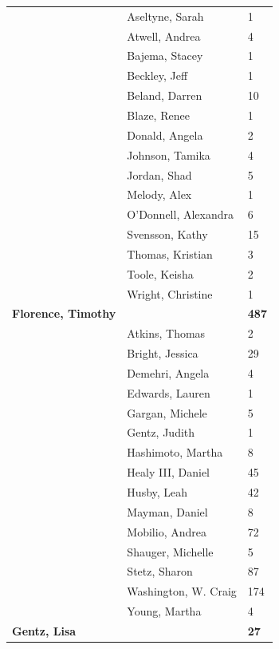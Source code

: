 \documentclass{article}\usepackage[]{graphicx}\usepackage[]{color}
\begin{document}
{\begin{longtable} { >{\raggedright}p{}|p{}p{}}
   \rowcolor[gray]{0.90} & Aseltyne, Sarah & 1 \\ 
   \rowcolor[gray]{0.90} & Atwell, Andrea & 4 \\ 
   \rowcolor[gray]{0.90} & Bajema, Stacey & 1 \\ 
   & Beckley, Jeff & 1 \\ 
   & Beland, Darren & 10 \\ 
   & Blaze, Renee & 1 \\ 
   \rowcolor[gray]{0.90} & Donald, Angela & 2 \\ 
   \rowcolor[gray]{0.90} & Johnson, Tamika & 4 \\ 
   \rowcolor[gray]{0.90} & Jordan, Shad & 5 \\ 
   & Melody, Alex & 1 \\ 
   & O'Donnell, Alexandra & 6 \\ 
   & Svensson, Kathy & 15 \\ 
   \rowcolor[gray]{0.90} & Thomas, Kristian & 3 \\ 
   \rowcolor[gray]{0.90} & Toole, Keisha & 2 \\ 
   \rowcolor[gray]{0.90} & Wright, Christine & 1 \\ 
  \textbf{Florence, Timothy} &  & \hspace{2cm}\textbf{487} \\ 
   & Atkins, Thomas & 2 \\ 
   & Bright, Jessica & 29 \\ 
   \rowcolor[gray]{0.90} & Demehri, Angela & 4 \\ 
   \rowcolor[gray]{0.90} & Edwards, Lauren & 1 \\ 
   \rowcolor[gray]{0.90} & Gargan, Michele & 5 \\ 
   & Gentz, Judith & 1 \\ 
   & Hashimoto, Martha & 8 \\ 
   & Healy III, Daniel & 45 \\ 
   \rowcolor[gray]{0.90} & Husby, Leah & 42 \\ 
   \rowcolor[gray]{0.90} & Mayman, Daniel & 8 \\ 
   \rowcolor[gray]{0.90} & Mobilio, Andrea & 72 \\ 
   & Shauger, Michelle & 5 \\ 
   & Stetz, Sharon & 87 \\ 
   & Washington, W. Craig & 174 \\ 
   \rowcolor[gray]{0.90} & Young, Martha & 4 \\ 
   \rowcolor[gray]{0.90}\textbf{Gentz, Lisa} &  & \hspace{2cm}\textbf{27} \\ 

\end{longtable}}
\end{document}
